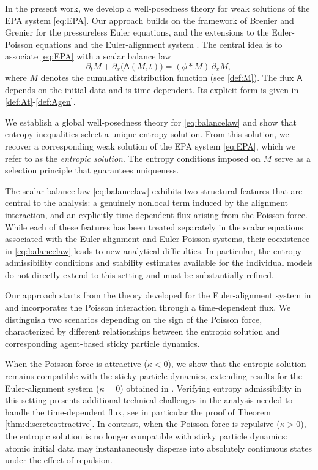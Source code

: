 \documentclass[11pt,reqno]{amsart}
\theoremstyle{definition}
\theoremstyle{remark}
\def\pa{\partial}
\def\A{\mathsf{A}}
\begin{document}
	In the present work, we develop a well-posedness theory for weak solutions of the EPA system \eqref{eq:EPA}. Our approach builds on the framework of Brenier and Grenier \cite{brenier1998sticky} for the pressureless Euler equations, and the extensions to the Euler-Poisson equations \cite{nguyen2008pressureless, NguyenTudorascu2015} and the Euler-alignment system \cite{leslie2023sticky}. The central idea is to associate \eqref{eq:EPA} with a scalar balance law
	\begin{equation}
		\label{eq:balancelaw}
		\pa_t M + \pa_x\big(\A(M,t)\big) = (\phi\ast M)\,\pa_x M,
	\end{equation}
	where $M$ denotes the cumulative distribution function (see \eqref{def:M}). The flux $\A$ depends on the initial data and is time-dependent. Its explicit form is given in \eqref{def:At}-\eqref{def:Agen}.
	
	We establish a global well-posedness theory for \eqref{eq:balancelaw} and show that entropy inequalities select a unique entropy solution. From this solution, we recover a corresponding weak solution of the EPA system \eqref{eq:EPA}, which we refer to as the \emph{entropic solution}. The entropy conditions imposed on $M$ serve as a selection principle that guarantees uniqueness.
	
	The scalar balance law \eqref{eq:balancelaw} exhibits two structural features that are central to the analysis: a genuinely nonlocal term induced by the alignment interaction, and an explicitly time-dependent flux arising from the Poisson force. While each of these features has been treated separately in the scalar equations associated with the Euler-alignment and Euler-Poisson systems, their coexistence in \eqref{eq:balancelaw} leads to new analytical difficulties. In particular, the entropy admissibility conditions and stability estimates available for the individual models do not directly extend to this setting and must be substantially refined.
	
	Our approach starts from the theory developed for the Euler-alignment system in \cite{leslie2023sticky} and incorporates the Poisson interaction through a time-dependent flux. We distinguish two scenarios depending on the sign of the Poisson force, characterized by different relationships between the entropic solution and corresponding agent-based sticky particle dynamics. 
	
	When the Poisson force is attractive ($\kappa<0$), we show that the entropic solution remains compatible with the sticky particle dynamics, extending results for the Euler-alignment system ($\kappa=0$) obtained in \cite{leslie2023sticky}. Verifying entropy admissibility in this setting presents additional technical challenges in the analysis needed to handle the time-dependent flux, see in particular the proof of Theorem \ref{thm:discreteattractive}.
	In contrast, when the Poisson force is repulsive ($\kappa>0$), the entropic solution is no longer compatible with sticky particle dynamics: atomic initial data may instantaneously disperse into absolutely continuous states under the effect of repulsion.
	\medskip
	
\end{document}
